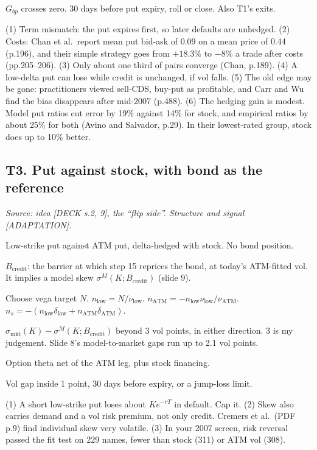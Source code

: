 \documentclass[10pt,a4paper]{article}
\newcommand{\DECK}[1]{\textsf{\footnotesize\textcolor{tagdeck}{[DECK s.#1]}}}
\newcommand{\ADAPT}{\textsf{\footnotesize\textcolor{tagadapt}{[ADAPTATION]}}}
\newcommand{\Gbp}{G_{bp}}
\begin{document}
\begin{description}[style=sameline,leftmargin=1.9cm,labelwidth=1.7cm,labelsep=0.2cm,itemsep=1pt,parsep=0pt,font=\bfseries]
\item[Exit] $\Gbp$ crosses zero. 30 days before put expiry, roll or close. Also T1's exits.
\item[Goes wrong] (1) Term mismatch: the put expires first, so later defaults are unhedged. (2) Costs: Chan et al.\ report mean put bid-ask of 0.09 on a mean price of 0.44 (p.196), and their simple strategy goes from $+18.3\%$ to $-8\%$ a trade after costs (pp.205--206). (3) Only about one third of pairs converge (Chan, p.189). (4) A low-delta put can lose while credit is unchanged, if vol falls. (5) The old edge may be gone: practitioners viewed sell-CDS, buy-put as profitable, and Carr and Wu find the bias disappears after mid-2007 (p.488). (6) The hedging gain is modest. Model put ratios cut error by 19\% against 14\% for stock, and empirical ratios by about 25\% for both (Avino and Salvador, p.29). In their lowest-rated group, stock does up to 10\% better.
\end{description}

\subsection*{T3. Put against stock, with bond as the reference}
\textit{Source: idea \DECK{2, 9}, the ``flip side''. Structure and signal \ADAPT.}
\begin{description}[style=sameline,leftmargin=1.9cm,labelwidth=1.7cm,labelsep=0.2cm,itemsep=1pt,parsep=0pt,font=\bfseries]
\item[Legs] Low-strike put against ATM put, delta-hedged with stock. No bond position.
\item[Reference] $B_{\text{credit}}$: the barrier at which step 15 reprices the bond, at today's ATM-fitted vol. It implies a model skew $\sigma^M(K;B_{\text{credit}})$ (slide 9).
\item[Size] Choose vega target $N$. $n_{\text{low}}=N/\nu_{\text{low}}$. $n_{\text{ATM}}=-n_{\text{low}}\nu_{\text{low}}/\nu_{\text{ATM}}$. $n_s=-(n_{\text{low}}\delta_{\text{low}}+n_{\text{ATM}}\delta_{\text{ATM}})$.
\item[Signal] $\sigma_{\text{mkt}}(K)-\sigma^M(K;B_{\text{credit}})$ beyond 3 vol points, in either direction. 3 is my judgement. Slide 8's model-to-market gaps run up to 2.1 vol points.
\item[Carry] Option theta net of the ATM leg, plus stock financing.
\item[Exit] Vol gap inside 1 point, 30 days before expiry, or a jump-loss limit.
\item[Goes wrong] (1) A short low-strike put loses about $Ke^{-rT}$ in default. Cap it. (2) Skew also carries demand and a vol risk premium, not only credit. Cremers et al.\ (PDF p.9) find individual skew very volatile. (3) In your 2007 screen, risk reversal passed the fit test on 229 names, fewer than stock (311) or ATM vol (308).
\end{description}
\end{document}
